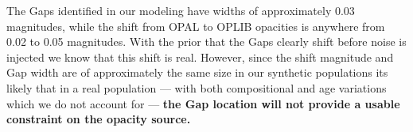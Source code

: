 The Gaps identified in our modeling have widths of approximately 0.03
magnitudes, while the shift from OPAL to OPLIB opacities is anywhere from 0.02
to 0.05 magnitudes. With the prior that the Gaps clearly shift before noise is
injected we know that this shift is real. However, since the shift magnitude
and Gap width are of approximately the same size in our synthetic populations
its likely that in a real population --- with both compositional and age
variations which we do not account for --- \textbf{the Gap location will not
provide a usable constraint on the opacity source.}
